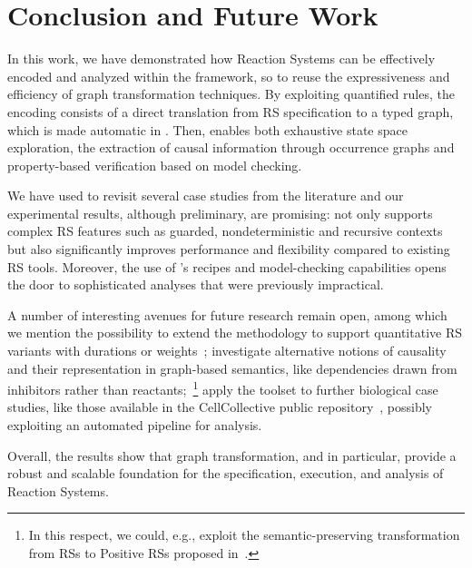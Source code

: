 
\section{Conclusion and Future Work}\label{sec:conc}



In this work, we have demonstrated how Reaction Systems can be effectively encoded and analyzed within the \GROOVE framework, so to reuse the expressiveness and efficiency of graph transformation techniques. By exploiting quantified rules, the encoding consists of a direct translation from RS specification to a typed graph, which is made automatic in \BioResolve.
Then, \GROOVE enables both exhaustive state space exploration, the extraction of causal information through occurrence graphs and property-based verification based on model checking.

We have used \GROOVE to revisit several case studies from the literature and our experimental results, although preliminary, are promising: \GROOVE not only supports complex RS features such as guarded, nondeterministic and recursive contexts but also significantly improves performance and flexibility compared to existing RS tools.
Moreover, the use of \GROOVE’s recipes and model-checking capabilities opens the door to sophisticated analyses that were previously impractical.

A number of interesting avenues for future research remain open, among which we mention the possibility to extend the methodology to support quantitative RS variants with durations or weights~\cite{DBLP:journals/nca/BrodoBFGLM23}; investigate alternative notions of causality and their representation in graph-based semantics, like dependencies drawn from inhibitors rather than reactants;~\footnote{In this respect, we could, e.g., exploit the semantic-preserving transformation from RSs to Positive RSs proposed in~\cite{DBLP:journals/sttt/BrodoBFGMMP24}.} apply the \GROOVE toolset to further biological case studies, like those available in the CellCollective public repository~\cite{helikar2012cell}, possibly exploiting an automated pipeline for analysis.

Overall, the results show that graph transformation, and \GROOVE in particular, provide a robust and scalable foundation for the specification, execution, and analysis of Reaction Systems.